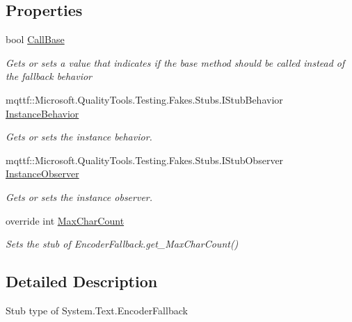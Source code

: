 \subsection*{Properties}
\begin{DoxyCompactItemize}
\item 
bool \hyperlink{class_system_1_1_text_1_1_fakes_1_1_stub_encoder_fallback_a5de09a35903f5a0aba25f3685a4894a0}{Call\-Base}
\begin{DoxyCompactList}\small\item\em Gets or sets a value that indicates if the base method should be called instead of the fallback behavior\end{DoxyCompactList}\item 
mqttf\-::\-Microsoft.\-Quality\-Tools.\-Testing.\-Fakes.\-Stubs.\-I\-Stub\-Behavior \hyperlink{class_system_1_1_text_1_1_fakes_1_1_stub_encoder_fallback_ab57b23ea4fa628c6e493ecb934b046ef}{Instance\-Behavior}
\begin{DoxyCompactList}\small\item\em Gets or sets the instance behavior.\end{DoxyCompactList}\item 
mqttf\-::\-Microsoft.\-Quality\-Tools.\-Testing.\-Fakes.\-Stubs.\-I\-Stub\-Observer \hyperlink{class_system_1_1_text_1_1_fakes_1_1_stub_encoder_fallback_a585e29a44f64d210a25f11dc56cd07f7}{Instance\-Observer}
\begin{DoxyCompactList}\small\item\em Gets or sets the instance observer.\end{DoxyCompactList}\item 
override int \hyperlink{class_system_1_1_text_1_1_fakes_1_1_stub_encoder_fallback_ada1fb31f762ff1fdcf20dba514ad75d2}{Max\-Char\-Count}
\begin{DoxyCompactList}\small\item\em Sets the stub of Encoder\-Fallback.\-get\-\_\-\-Max\-Char\-Count()\end{DoxyCompactList}\end{DoxyCompactItemize}


\subsection{Detailed Description}
Stub type of System.\-Text.\-Encoder\-Fallback




